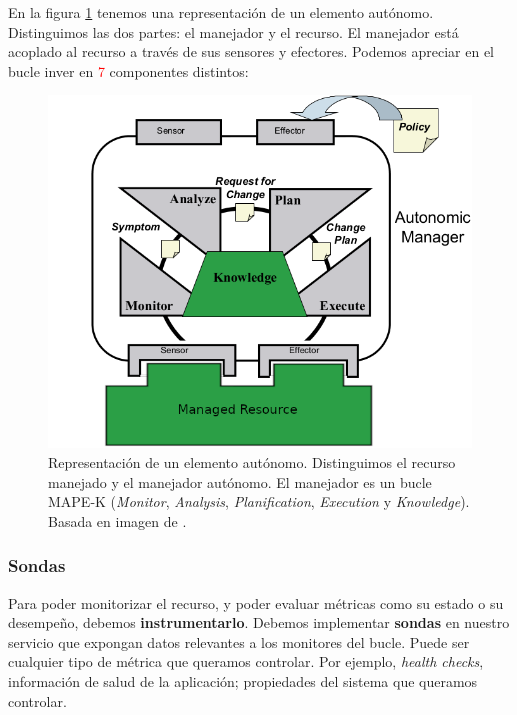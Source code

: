 En la figura \ref{fig:autonomic-element} tenemos una representación de un elemento autónomo. Distinguimos las dos partes: el manejador y el recurso. El manejador está acoplado al recurso a través de sus sensores y efectores. Podemos apreciar en el bucle inver en \textcolor{red}{7} componentes distintos: \cite{ibmcorporationArchitecturalBlueprintAutonomic2006}

\begin{figure}[h]
  \centering
  \includegraphics[scale=2]{02_contexto_tecnologico/images/autonomic-element}
  \caption[Representación de un elemento autónomo. Distinguimos el recurso manejado y el manejador autónomo. El manejador es un bucle MAPE-K (\emph{Monitor}, \emph{Analysis}, \emph{Planification}, \emph{Execution} y \emph{Knowledge})]{Representación de un elemento autónomo. Distinguimos el recurso manejado y el manejador autónomo. El manejador es un bucle MAPE-K (\emph{Monitor}, \emph{Analysis}, \emph{Planification}, \emph{Execution} y \emph{Knowledge}). Basada en imagen de \cite{ibmcorporationArchitecturalBlueprintAutonomic2006}.}
  \label{fig:autonomic-element}
\end{figure}

\subsubsection{Sondas}
Para poder monitorizar el recurso, y poder evaluar métricas como su estado o su desempeño, debemos \textbf{instrumentarlo}. Debemos implementar \textbf{sondas} en nuestro servicio que expongan datos relevantes a los monitores del bucle. Puede ser cualquier tipo de métrica que queramos controlar. Por ejemplo, \emph{health checks}, información de salud de la aplicación; propiedades del sistema que queramos controlar.

